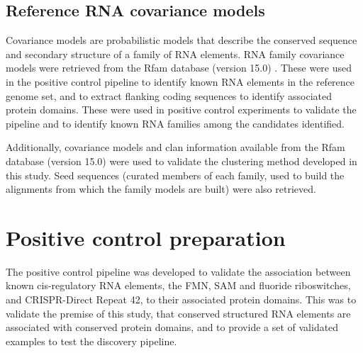 \subsection{Reference RNA covariance models}
\label{subsec:covariance-models}

Covariance models are probabilistic models that describe the conserved sequence and secondary structure of a family of RNA elements.
RNA family covariance models were retrieved from the Rfam database (version 15.0) \citep{Ontiveros-Palacios2025}.
These were used in the positive control pipeline to identify known RNA elements in the reference genome set, and to extract flanking coding sequences to identify associated protein domains.
These were used in positive control experiments to validate the pipeline and to identify known RNA families among the candidates identified.

Additionally, covariance models and clan information available from the Rfam database (version 15.0) \citep{Ontiveros-Palacios2025} were used to validate the clustering method developed in this study.
Seed sequences (curated members of each family, used to build the alignments from which the family models are built) were also retrieved.


\section{Positive control preparation}
\label{sec:poscontrol-pipeline}

The positive control pipeline was developed to validate the association between known cis-regulatory RNA elements, the \ac{FMN}, \ac{SAM} and fluoride riboswitches, and \ac{CRISPR}-Direct Repeat 42, to their associated protein domains.
This was to validate the premise of this study, that conserved structured RNA elements are associated with conserved protein domains, and to provide a set of validated examples to test the discovery pipeline.

